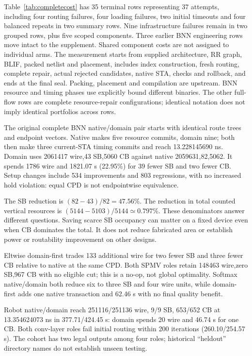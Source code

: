 \documentclass[conference,10pt]{IEEEtran}
\begin{document}
Table~\ref{tab:completecost} has 35 terminal rows representing 37 attempts, including four routing failures, four loading failures, two initial timeouts and four balanced repeats in two summary rows. Nine infrastructure failures remain in two grouped rows, plus five scoped components. Three earlier BNN engineering rows move intact to the supplement. Shared component costs are not assigned to individual arms. The measurement starts from supplied architecture, RR graph, BLIF, packed netlist and placement, includes index construction, fresh routing, complete repair, actual rejected candidates, native STA, checks and rollback, and ends at the final seal. Packing, placement and compilation are upstream. BNN resource and timing phases use explicitly bound different binaries. The other full-flow rows are complete resource-repair configurations; identical notation does not imply identical portfolios across rows.

The original complete BNN native/domain pair starts with identical route trees and endpoint vectors. Native makes five resource commits, domain nine; both then make three current-STA timing commits and reach 13.228145690 ns. Domain uses 2061417 wire,43 SB,5060 CB against native 2059631,82,5062. It spends 1786 wire and 1821.07 s (22.95\%) for 39 fewer SB and two fewer CB. Setup changes include 534 improvements and 803 regressions, with no increased hold violation: equal CPD is not endpointwise equivalence.

The SB reduction is $(82-43)/82=47.56\%$. The reduction in total counted vertical resources is $(5144-5103)/5144\simeq 0.797\%$. These denominators answer different questions. Saving scarce SB occupancy can matter on a fixed device even when CB dominates the total. It does not reduce fabricated area or establish power or routability improvement on other designs.

Eltwise domain-first trades 133 additional wire for two fewer SB and three fewer CB relative to native at the same CPD. Both SPMV roles retain 148463 wire,zero SB,967 CB with no eligible cut; this is a no-op, not global optimality. Softmax native/domain both reduce six to three SB and four wire units, while domain-first adds one native transaction and 62.46 s with no final quality benefit.

Robot native/domain reach 251116/251136 wire, 9/9 SB, 653/652 CB at 13.354624073 ns in 377.71/424.45 s: domain spends 20 wire and 46.74 s for one CB. Both conv-layer roles fail initial routing within 200 iterations (260.10/254.57 s). The cohort has two legal outputs among four roles; historical ``heldout'' directory names do not establish unseen testing.
\end{document}
